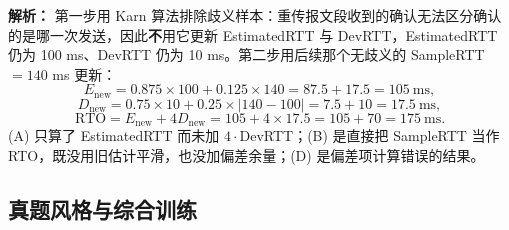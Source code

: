\begin{enumerate}
\ifshowsolutions\par\noindent\textbf{解析：} 第一步用 Karn 算法排除歧义样本：重传报文段收到的确认无法区分确认的是哪一次发送，因此\textbf{不}用它更新 EstimatedRTT 与 DevRTT，EstimatedRTT 仍为 100 ms、DevRTT 仍为 10 ms。第二步用后续那个无歧义的 SampleRTT $=140$ ms 更新：
\[
E_{\text{new}}=0.875\times100+0.125\times140=87.5+17.5=105\ \text{ms},
\]
\[
D_{\text{new}}=0.75\times10+0.25\times\lvert140-100\rvert=7.5+10=17.5\ \text{ms},
\]
\[
\mathrm{RTO}=E_{\text{new}}+4D_{\text{new}}=105+4\times17.5=105+70=175\ \text{ms}.
\]
(A) 只算了 EstimatedRTT 而未加 $4\cdot$DevRTT；(B) 是直接把 SampleRTT 当作 RTO，既没用旧估计平滑，也没加偏差余量；(D) 是偏差项计算错误的结果。\else \answerarea \fi

\end{enumerate}

\subsection{真题风格与综合训练}

